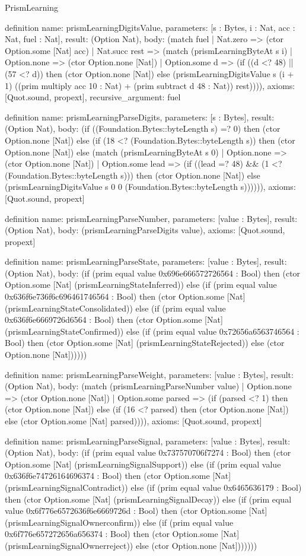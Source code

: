 \begin{lexlean}{PrismLearning}
\begin{semanticmodule}
definition{
  name: prismLearningDigitsValue,
  parameters: [s : Bytes, i : Nat, acc : Nat, fuel : Nat],
  result: (Option Nat),
  body: (match fuel
    | Nat.zero => (ctor Option.some [Nat] acc)
    | Nat.succ rest => (match (prismLearningByteAt s i)
      | Option.none => (ctor Option.none [Nat])
      | Option.some d => (if ((d <? 48) || (57 <? d)) then (ctor Option.none [Nat]) else (prismLearningDigitsValue s (i + 1) ((prim multiply acc 10 : Nat) + (prim subtract d 48 : Nat)) rest)))),
  axioms: [Quot.sound, propext],
  recursive_argument: fuel
}

definition{
  name: prismLearningParseDigits,
  parameters: [s : Bytes],
  result: (Option Nat),
  body: (if ((Foundation.Bytes::byteLength s) =? 0) then (ctor Option.none [Nat]) else (if (18 <? (Foundation.Bytes::byteLength s)) then (ctor Option.none [Nat]) else (match (prismLearningByteAt s 0)
    | Option.none => (ctor Option.none [Nat])
    | Option.some lead => (if ((lead =? 48) && (1 <? (Foundation.Bytes::byteLength s))) then (ctor Option.none [Nat]) else (prismLearningDigitsValue s 0 0 (Foundation.Bytes::byteLength s)))))),
  axioms: [Quot.sound, propext]
}

definition{
  name: prismLearningParseNumber,
  parameters: [value : Bytes],
  result: (Option Nat),
  body: (prismLearningParseDigits value),
  axioms: [Quot.sound, propext]
}

definition{
  name: prismLearningParseState,
  parameters: [value : Bytes],
  result: (Option Nat),
  body: (if (prim equal value 0x696e666572726564 : Bool) then (ctor Option.some [Nat] (prismLearningStateInferred)) else (if (prim equal value 0x636f6e736f6c696461746564 : Bool) then (ctor Option.some [Nat] (prismLearningStateConsolidated)) else (if (prim equal value 0x636f6e6669726d6564 : Bool) then (ctor Option.some [Nat] (prismLearningStateConfirmed)) else (if (prim equal value 0x72656a6563746564 : Bool) then (ctor Option.some [Nat] (prismLearningStateRejected)) else (ctor Option.none [Nat])))))
}

definition{
  name: prismLearningParseWeight,
  parameters: [value : Bytes],
  result: (Option Nat),
  body: (match (prismLearningParseNumber value)
    | Option.none => (ctor Option.none [Nat])
    | Option.some parsed => (if (parsed <? 1) then (ctor Option.none [Nat]) else (if (16 <? parsed) then (ctor Option.none [Nat]) else (ctor Option.some [Nat] parsed)))),
  axioms: [Quot.sound, propext]
}

definition{
  name: prismLearningParseSignal,
  parameters: [value : Bytes],
  result: (Option Nat),
  body: (if (prim equal value 0x737570706f7274 : Bool) then (ctor Option.some [Nat] (prismLearningSignalSupport)) else (if (prim equal value 0x636f6e74726164696374 : Bool) then (ctor Option.some [Nat] (prismLearningSignalContradict)) else (if (prim equal value 0x6465636179 : Bool) then (ctor Option.some [Nat] (prismLearningSignalDecay)) else (if (prim equal value 0x6f776e6572636f6e6669726d : Bool) then (ctor Option.some [Nat] (prismLearningSignalOwnerconfirm)) else (if (prim equal value 0x6f776e657272656a656374 : Bool) then (ctor Option.some [Nat] (prismLearningSignalOwnerreject)) else (ctor Option.none [Nat]))))))
}


\end{semanticmodule}
\end{lexlean}
